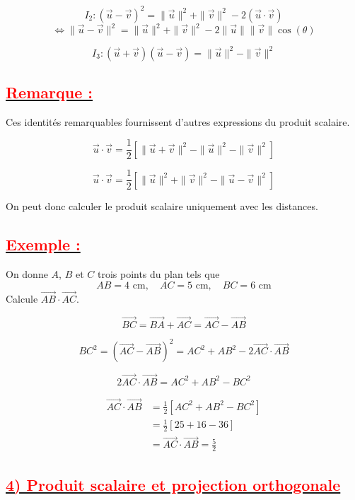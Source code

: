 \documentclass[12pt,a4paper]{article}
\begin{document}
\[
I_2 : (\vec{u} - \vec{v})^2 = \|\vec{u}\|^2 + \|\vec{v}\|^2 - 2(\vec{u} \cdot \vec{v})
\]
\[
\iff \|\vec{u} - \vec{v}\|^2 = \|\vec{u}\|^2 + \|\vec{v}\|^2 - 2\|\vec{u}\|\|\vec{v}\| \cos(\theta)
\]

\[
I_3 : (\vec{u} + \vec{v})(\vec{u} - \vec{v}) = \|\vec{u}\|^2 - \|\vec{v}\|^2
\]

\subsection*{\underline{\textbf{\textcolor{red}{Remarque :}}}}
Ces identités remarquables fournissent d'autres expressions du produit scalaire.

\[
\overrightarrow{u} \cdot \overrightarrow{v} = \frac{1}{2} \left[ \|\overrightarrow{u} + \overrightarrow{v}\|^2 - \|\overrightarrow{u}\|^2 - \|\overrightarrow{v}\|^2 \right]
\]

\[
\overrightarrow{u} \cdot \overrightarrow{v} = \frac{1}{2} \left[ \|\overrightarrow{u}\|^2 + \|\overrightarrow{v}\|^2 - \|\overrightarrow{u} - \overrightarrow{v}\|^2 \right]
\]

On peut donc calculer le produit scalaire uniquement avec les distances.

\subsection*{\underline{\textbf{\textcolor{red}{Exemple :}}}}
On donne $A$, $B$ et $C$ trois points du plan tels que 
\[
AB = 4\text{ cm}, \quad AC = 5\text{ cm}, \quad BC = 6\text{ cm}
\]
Calcule $\overrightarrow{AB} \cdot \overrightarrow{AC}$.

\[
\overrightarrow{BC} = \overrightarrow{BA} + \overrightarrow{AC} = \overrightarrow{AC} - \overrightarrow{AB}
\]

\[
BC^2 = (\overrightarrow{AC} - \overrightarrow{AB})^2 = AC^2 + AB^2 - 2\overrightarrow{AC} \cdot \overrightarrow{AB}
\]

\[
2\overrightarrow{AC} \cdot \overrightarrow{AB} = AC^2 + AB^2 - BC^2
\]

\begin{align*}
\overrightarrow{AC} \cdot \overrightarrow{AB} &= \frac{1}{2} \left[ AC^2 + AB^2 - BC^2 \right] \\
&= \frac{1}{2} \left[ 25 + 16 - 36 \right] \\
&= \overrightarrow{AC} \cdot \overrightarrow{AB} = \frac{5}{2}
\end{align*}

\subsection*{\underline{\textbf{\textcolor{red}{4) Produit scalaire et projection orthogonale}}}}
\end{document}

